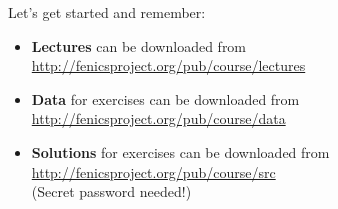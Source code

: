 \documentclass{fenicscourse}
\begin{document}










\begin{frame}{Let's get started and remember:}

\linespread{2.0}
\bigskip
\begin{itemize}
\item
{\footnotesize \textbf{Lectures} can be downloaded from
  \url{http://fenicsproject.org/pub/course/lectures}}

\item
{\footnotesize \textbf{Data} for exercises can be downloaded from
  \url{http://fenicsproject.org/pub/course/data}}

\item
{\footnotesize \textbf{Solutions} for exercises can be downloaded from
  \url{http://fenicsproject.org/pub/course/src} \\
(Secret password needed!)
}
\end{itemize}
\linespread{1.0}\

\end{frame}
\end{document}
